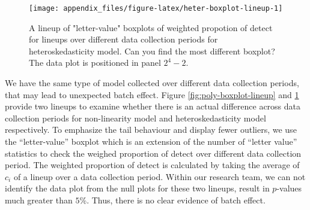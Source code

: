 \documentclass[]{interact}
\theoremstyle{plain}%
\theoremstyle{definition}
\theoremstyle{remark}
\begin{document}
\begin{figure}

{\centering \texttt{[image: appendix\_files/figure-latex/heter-boxplot-lineup-1]} 

}

\caption{A lineup of "letter-value" boxplots of weighted propotion of detect for lineups over different data collection periods for heteroskedasticity model. Can you find the most different boxplot? The data plot is positioned in panel $2^4 - 2$.}\label{fig:heter-boxplot-lineup}
\end{figure}

We have the same type of model collected over different data collection
periods, that may lead to unexpected batch effect. Figure
\ref{fig:poly-boxplot-lineup} and \ref{fig:heter-boxplot-lineup} provide
two lineups to examine whether there is an actual difference across data
collection periods for non-linearity model and heteroskedasticity model
respectively. To emphasize the tail behaviour and display fewer
outliers, we use the ``letter-value'' boxplot \citep{hofmann2017value}
which is an extension of the number of ``letter value'' statistics to
check the weighed proportion of detect over different data collection
period. The weighted proportion of detect is calculated by taking the
average of \(c_i\) of a lineup over a data collection period. Within our
research team, we can not identify the data plot from the null plots for
these two lineups, result in \(p\)-values much greater than \(5\)\%.
Thus, there is no clear evidence of batch effect.



\end{document}

